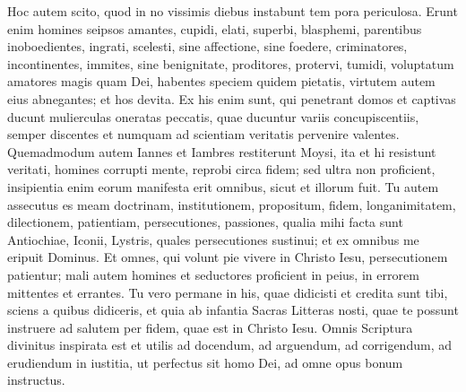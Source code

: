 \begin{biblechapter} 
\verse Hoc autem scito, quod in no vissimis diebus instabunt tem pora periculosa. 
\verse Erunt enim homines seipsos amantes, cupidi, elati, superbi, blasphemi, parentibus inoboedientes, ingrati, scelesti, 
\verse sine affectione, sine foedere, criminatores, incontinentes, immites, sine benignitate, 
\verse proditores, protervi, tumidi, voluptatum amatores magis quam Dei, 
\verse habentes speciem quidem pietatis, virtutem autem eius abnegantes; et hos devita. 
\verse Ex his enim sunt, qui penetrant domos et captivas ducunt mulierculas oneratas peccatis, quae ducuntur variis concupiscentiis, 
\verse semper discentes et numquam ad scientiam veritatis pervenire valentes. 
\verse Quemadmodum autem Iannes et Iambres restiterunt Moysi, ita et hi resistunt veritati, homines corrupti mente, reprobi circa fidem; 
\verse sed ultra non proficient, insipientia enim eorum manifesta erit omnibus, sicut et illorum fuit. 
\verse Tu autem assecutus es meam doctrinam, institutionem, propositum, fidem, longanimitatem, dilectionem, patientiam, 
\verse persecutiones, passiones, qualia mihi facta sunt Antiochiae, Iconii, Lystris, quales persecutiones sustinui; et ex omnibus me eripuit Dominus. 
\verse Et omnes, qui volunt pie vivere in Christo Iesu, persecutionem patientur; 
\verse mali autem homines et seductores proficient in peius, in errorem mittentes et errantes. 
\verse Tu vero permane in his, quae didicisti et credita sunt tibi, sciens a quibus didiceris, 
\verse et quia ab infantia Sacras Litteras nosti, quae te possunt instruere ad salutem per fidem, quae est in Christo Iesu. 
\verse Omnis Scriptura divinitus inspirata est et utilis ad docendum, ad arguendum, ad corrigendum, ad erudiendum in iustitia, 
\verse ut perfectus sit homo Dei, ad omne opus bonum instructus. 
\end{biblechapter}

